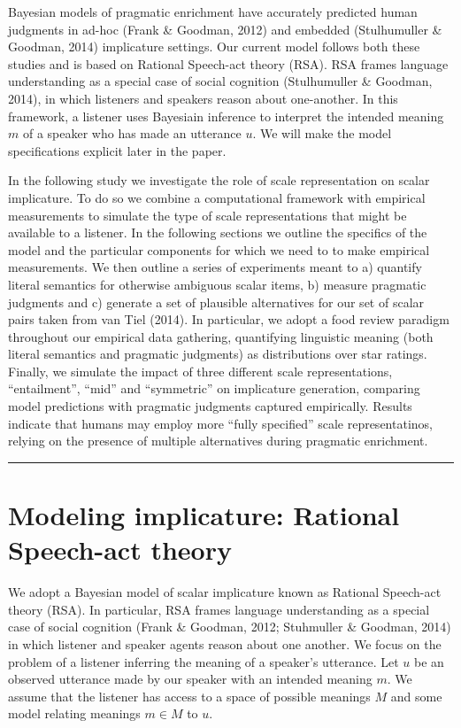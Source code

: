 \documentclass[10pt, letterpaper]{article}
\begin{document}
Bayesian models of pragmatic enrichment have accurately predicted human
judgments in ad-hoc (Frank \& Goodman, 2012) and embedded (Stulhumuller
\& Goodman, 2014) implicature settings. Our current model follows both
these studies and is based on Rational Speech-act theory (RSA). RSA
frames language understanding as a special case of social cognition
(Stulhumuller \& Goodman, 2014), in which listeners and speakers reason
about one-another. In this framework, a listener uses Bayesiain
inference to interpret the intended meaning \(m\) of a speaker who has
made an utterance \(u\). We will make the model specifications explicit
later in the paper.

In the following study we investigate the role of scale representation
on scalar implicature. To do so we combine a computational framework
with empirical measurements to simulate the type of scale
representations that might be available to a listener. In the following
sections we outline the specifics of the model and the particular
components for which we need to to make empirical measurements. We then
outline a series of experiments meant to a) quantify literal semantics
for otherwise ambiguous scalar items, b) measure pragmatic judgments and
c) generate a set of plausible alternatives for our set of scalar pairs
taken from van Tiel (2014). In particular, we adopt a food review
paradigm throughout our empirical data gathering, quantifying linguistic
meaning (both literal semantics and pragmatic judgments) as
distributions over star ratings. Finally, we simulate the impact of
three different scale representations, ``entailment'', ``mid'' and
``symmetric'' on implicature generation, comparing model predictions
with pragmatic judgments captured empirically. Results indicate that
humans may employ more ``fully specified'' scale representatinos,
relying on the presence of multiple alternatives during pragmatic
enrichment.

\begin{center}\rule{0.5\linewidth}{\linethickness}\end{center}

\section{Modeling implicature: Rational Speech-act
theory}\label{modeling-implicature-rational-speech-act-theory}

We adopt a Bayesian model of scalar implicature known as Rational
Speech-act theory (RSA). In particular, RSA frames language
understanding as a special case of social cognition (Frank \& Goodman,
2012; Stuhmuller \& Goodman, 2014) in which listener and speaker agents
reason about one another. We focus on the problem of a listener
inferring the meaning of a speaker's utterance. Let \(u\) be an observed
utterance made by our speaker with an intended meaning \(m\). We assume
that the listener has access to a space of possible meanings \(M\) and
some model relating meanings \(m \in M\) to \(u\).
\end{document}
